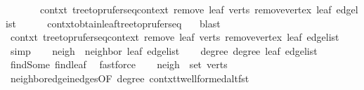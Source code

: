 \begin{isabellebody}
\ \ \ \ \ \ \ contxt{\isacharprime}{\kern0pt}{\isacharcolon}{\kern0pt}\ {\isachardoublequoteopen}tree{\isacharunderscore}{\kern0pt}to{\isacharunderscore}{\kern0pt}prufer{\isacharunderscore}{\kern0pt}seq{\isacharunderscore}{\kern0pt}context\ {\isacharparenleft}{\kern0pt}remove{}\ leaf\ verts{\isacharparenright}{\kern0pt}\ {\isacharparenleft}{\kern0pt}remove{\isacharunderscore}{\kern0pt}vertex\ leaf\ {\isacharquery}{\kern0pt}edge{\isacharunderscore}{\kern0pt}list{\isacharparenright}{\kern0pt}{\isachardoublequoteclose}\isanewline
\ \ \ \ \isamarkupfalse%
\ contxt{\isachardot}{\kern0pt}obtain{\isacharunderscore}{\kern0pt}leaf{\isacharunderscore}{\kern0pt}tree{\isacharunderscore}{\kern0pt}to{\isacharunderscore}{\kern0pt}prufer{\isacharunderscore}{\kern0pt}seq\ {}\ \isamarkupfalse%
\ blast\isanewline
\ \ \isamarkupfalse%
\ \isamarkupfalse%
\ contxt{\isacharprime}{\kern0pt}{\isacharcolon}{\kern0pt}\ tree{\isacharunderscore}{\kern0pt}to{\isacharunderscore}{\kern0pt}prufer{\isacharunderscore}{\kern0pt}seq{\isacharunderscore}{\kern0pt}context\ {\isachardoublequoteopen}remove{}\ leaf\ verts{\isachardoublequoteclose}\ {\isachardoublequoteopen}remove{\isacharunderscore}{\kern0pt}vertex\ leaf\ {\isacharquery}{\kern0pt}edge{\isacharunderscore}{\kern0pt}list{\isachardoublequoteclose}\ \isamarkupfalse%
\ simp\isanewline
\isanewline
\ \ \isamarkupfalse%
\ {\isacharquery}{\kern0pt}neigh\ {\isacharequal}{\kern0pt}\ {\isachardoublequoteopen}neighbor\ leaf\ {\isacharquery}{\kern0pt}edge{\isacharunderscore}{\kern0pt}list{\isachardoublequoteclose}\isanewline
\ \ \isamarkupfalse%
\ degree{\isacharcolon}{\kern0pt}\ {\isachardoublequoteopen}degree\ leaf\ {\isacharquery}{\kern0pt}edge{\isacharunderscore}{\kern0pt}list\ {\isasymge}\ {}{\isachardoublequoteclose}\ \isamarkupfalse%
\ find{\isacharunderscore}{\kern0pt}Some\ find{\isacharunderscore}{\kern0pt}leaf\ \isamarkupfalse%
\ fastforce\isanewline
\ \ \isamarkupfalse%
\ {\isachardoublequoteopen}{\isacharquery}{\kern0pt}neigh\ {\isasymin}\ set\ verts{\isachardoublequoteclose}\ \isamarkupfalse%
\ neighbor{\isacharunderscore}{\kern0pt}edge{\isacharunderscore}{\kern0pt}in{\isacharunderscore}{\kern0pt}edges{\isacharbrackleft}{\kern0pt}OF\ degree{\isacharbrackright}{\kern0pt}\ contxt{\isachardot}{\kern0pt}t{\isachardot}{\kern0pt}wellformed{\isacharunderscore}{\kern0pt}alt{\isacharunderscore}{\kern0pt}fst\ \isamarkupfalse%

\end{isabellebody}
